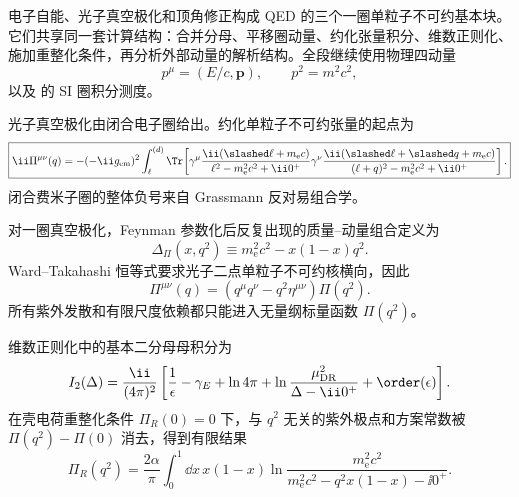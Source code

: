 
电子自能、光子真空极化和顶角修正构成 QED 的三个一圈单粒子不可约基本块。它们共享同一套计算结构：合并分母、平移圈动量、约化张量积分、维数正则化、施加重整化条件，再分析外部动量的解析结构。全段继续使用物理四动量
\begin{equation*}
 p^\mu=(E/c,\mathbf p),
 \qquad p^2=m^2c^2,
\end{equation*}
以及 的 SI 圈积分测度。

光子真空极化由闭合电子圈给出。约化单粒子不可约张量的起点为
\begin{equation}
 \boxed{
 \ii\Pi^{\mu\nu}(q)
 =-(-\ii g_{\rm em})^2
 \int_{\ell}^{(d)}
 \Tr\!\left[
 \gamma^\mu\frac{\ii(\slashed\ell+m_{\mathrm e} c)}{\ell^2-m_{\mathrm e}^2c^2+\ii0^+}
 \gamma^\nu\frac{\ii(\slashed\ell+\slashed q+m_{\mathrm e} c)}{(\ell+q)^2-m_{\mathrm e}^2c^2+\ii0^+}
 \right].}
 \label{eq:vacuum-polarization-loop}
\end{equation}
闭合费米子圈的整体负号来自 Grassmann 反对易组合学。

对一圈真空极化，Feynman 参数化后反复出现的质量--动量组合定义为
\begin{equation}
 \boxed{
 \Delta_\Pi(x,q^2)
 \equiv m_{\mathrm e}^2c^2-x(1-x)q^2.}
 \label{eq:Pi-Delta-r12}
\end{equation}
Ward--Takahashi 恒等式要求光子二点单粒子不可约核横向，因此
\begin{equation}
 \boxed{
 \Pi^{\mu\nu}(q)
 =(q^\mu q^\nu-q^2\eta^{\mu\nu})\Pi(q^2).}
 \label{eq:Pi-transverse-r12}
\end{equation}
所有紫外发散和有限尺度依赖都只能进入无量纲标量函数 \(\Pi(q^2)\)。

维数正则化中的基本二分母母积分为
\begin{equation}
 I_2(\Delta)
 =\frac{\ii}{(4\pi)^2}
 \left[
 \frac1\epsilon-\gamma_E+\ln4\pi
 +\ln\frac{\mu_{\rm DR}^2}{\Delta-\ii0^+}
 +\order(\epsilon)
 \right].
 \label{eq:I2-expanded-r12}
\end{equation}
在壳电荷重整化条件 \(\Pi_R(0)=0\) 下，与 \(q^2\) 无关的紫外极点和方案常数被 \(\Pi(q^2)-\Pi(0)\) 消去，得到有限结果
\begin{equation}
 \boxed{
 \Pi_R(q^2)
 =\frac{2\alpha}{\pi}
 \int_0^1\dd x\,x(1-x)
 \ln\frac{m_{\mathrm e}^2c^2}
 {m_{\mathrm e}^2c^2-q^2x(1-x)-\ii0^+}.}
 \label{eq:Pi-renormalized-r12}
\end{equation}

